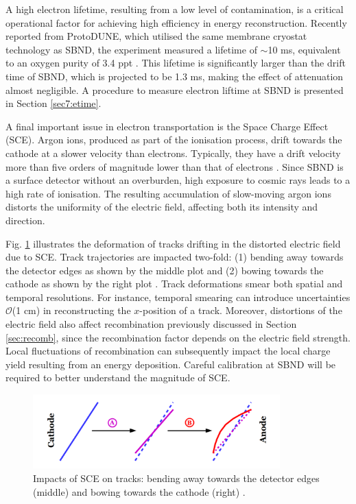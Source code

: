 A high electron lifetime, resulting from a low level of contamination, is a critical operational factor for achieving high efficiency in energy reconstruction.
Recently reported from ProtoDUNE, which utilised the same membrane cryostat technology as SBND, the experiment measured a lifetime of $\sim$10 ms, equivalent to an oxygen purity of 3.4 ppt \cite{protodune}.
This lifetime is significantly larger than the drift time of SBND, which is projected to be 1.3 ms, making the effect of attenuation almost negligible. 
A procedure to measure electron liftime at SBND is presented in Section \ref{sec7:etime}.



A final important issue in electron transportation is the Space Charge Effect (SCE).
Argon ions, produced as part of the ionisation process, drift towards the cathode at a slower velocity than electrons.
Typically, they have a drift velocity more than five orders of magnitude lower than that of electrons \cite{icarus_sce}.
Since SBND is a surface detector without an overburden, high exposure to cosmic rays leads to a high rate of ionisation.
The resulting accumulation of slow-moving argon ions distorts the uniformity of the electric field, affecting both its intensity and direction.

Fig. \ref{fig:SCE} illustrates the deformation of tracks drifting in the distorted electric field due to SCE.
Track trajectories are impacted two-fold: (1) bending away towards the detector edges as shown by the middle plot and (2) bowing towards the cathode as shown by the right plot \cite{SCE}.
Track deformations smear both spatial and temporal resolutions.
For instance, temporal smearing can introduce uncertainties $\mathcal{O}$(1 cm) in reconstructing the $x$-position of a track.
Moreover, distortions of the electric field also affect recombination previously discussed in Section \ref{sec:recomb}, since the recombination factor depends on the electric field strength.
Local fluctuations of recombination can subsequently impact the local charge yield resulting from an energy deposition.
Careful calibration at SBND will be required to better understand the magnitude of SCE.

\begin{figure}[htbp] 
\centering    
\includegraphics[width=0.85\textwidth]{SCE}
\caption[Impacts of Space Charge Effects on Tracks]{
Impacts of SCE on tracks: bending away towards the detector edges (middle) and bowing towards the cathode (right) \cite{SCE}.
}
\label{fig:SCE}
\end{figure}

